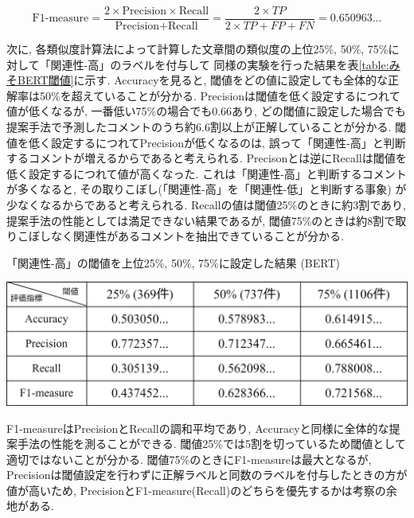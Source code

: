 \documentclass{ltjarticle}
\begin{document}
\begin{equation}
    \textrm{F1-measure} = \dfrac{2\times \textrm{Precision}\times \textrm{Recall}}{\textrm{Precision}+\textrm{Recall}} = \dfrac{2\times TP}{2\times TP+FP+FN} = 0.650963...
\end{equation}
\vspace{10truept}

次に, 各類似度計算法によって計算した文章間の類似度の上位25\%, 50\%, 75\%に対して「関連性-高」のラベルを付与して
同様の実験を行った結果を表\ref{table:みそBERT閾値}に示す. 
Accuracyを見ると, 閾値をどの値に設定しても全体的な正解率は50\%を超えていることが分かる. 
Precisionは閾値を低く設定するにつれて値が低くなるが, 一番低い75\%の場合でも0.66あり, どの閾値に設定した場合でも
提案手法で予測したコメントのうち約6.6割以上が正解していることが分かる. 
閾値を低く設定するにつれてPrecisionが低くなるのは, 誤って「関連性-高」と判断するコメントが増えるからであると考えられる. 
Precisonとは逆にRecallは閾値を低く設定するにつれて値が高くなった. 
これは「関連性-高」と判断するコメントが多くなると, その取りこぼし(「関連性-高」を「関連性-低」と判断する事象)
が少なくなるからであると考えられる. 
Recallの値は閾値25\%のときに約3割であり, 提案手法の性能としては満足できない結果であるが, 
閾値75\%のときは約8割で取りこぼしなく関連性があるコメントを抽出できていることが分かる. 
\vspace{5truept}

\begin{table}[ht]
    \centering
    \caption{「関連性-高」の閾値を上位25\%, 50\%, 75\%に設定した結果 (BERT)}
    \vspace{5truept}

    \includegraphics[width = 14cm]{images/BERT25.drawio.png}
    \label{table:みそBERT閾値}
\end{table}
\noindent
F1-measureはPrecisionとRecallの調和平均であり, Accuracyと同様に全体的な提案手法の性能を測ることができる. 
閾値25\%では5割を切っているため閾値として適切ではないことが分かる. 
閾値75\%のときにF1-measureは最大となるが, Precisionは閾値設定を行わずに正解ラベルと同数のラベルを付与したときの方が
値が高いため, PrecisionとF1-measure(Recall)のどちらを優先するかは考察の余地がある. 
\end{document}
